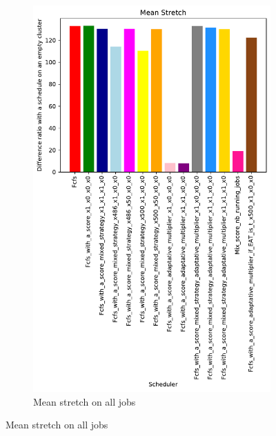 \documentclass[a4paper]{article}
\begin{document}
\begin{figure}[H]
\begin{subfigure}[b]{0.4\linewidth}\centering\includegraphics[width=0.9\linewidth]{MBSS/plot/Results_FCFS_Score_Adaptative_Multiplier_2022-08-16->2022-08-16_V9271_Mean_Stretch_450_128_32_256_4_1024.pdf}\caption{Mean stretch on all jobs}\end{subfigure}

\end{figure}
\end{document}
